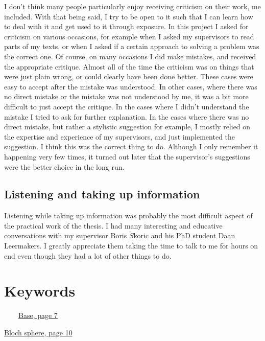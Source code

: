 \documentclass[]{article}
\begin{document}
I don't think many people particularly enjoy receiving criticism on their work, me included. With that being said, I try to be open to it such that I can learn how to deal with it and get used to it through exposure. In this project I asked for criticism on various occasions, for example when I asked my supervisors to read parts of my texts, or when I asked if a certain approach to solving a problem was the correct one. Of course, on many occasions I did make mistakes, and received the appropriate critique. Almost all of the time the criticism was on things that were just plain wrong, or could clearly have been done better. These cases were easy to accept after the mistake was understood. In other cases, where there was no direct mistake or the mistake was not understood by me, it was a bit more difficult to just accept the critique. In the cases where I didn't understand the mistake I tried to ask for further explanation. In the cases where there was no direct mistake, but rather a stylistic suggestion for example, I mostly relied on the expertise and experience of my supervisors, and just implemented the suggestion. I think this was the correct thing to do. Although I only remember it happening very few times, it turned out later that the supervisor's suggestions were the better choice in the long run.

\subsection{Listening and taking up information}

Listening while taking up information was probably the most difficult aspect of the practical work of the thesis. I had many interesting and educative conversations with my supervisor Boris $\check{S}$koric and his PhD student Daan Leermakers. I greatly appreciate them taking the time to talk to me for hours on end even though they had a lot of other things to do. 



\appendix


\section{Keywords}
\label{Keywords}


~~~~\hyperref[coloursandbases]{Base, page 7}

\hyperref[section:basisandphasetranslations]{Bloch sphere, page 10}
\end{document}
